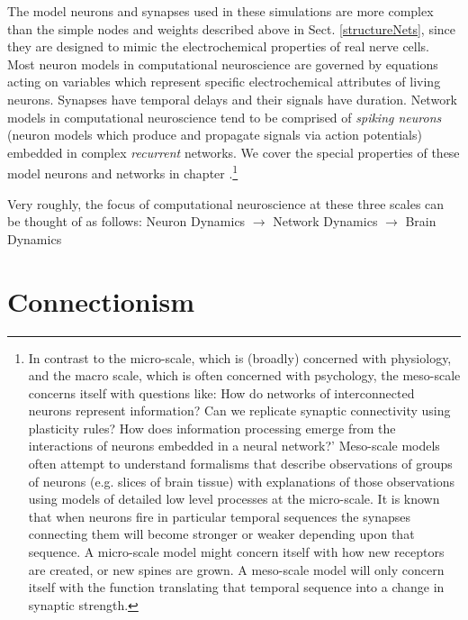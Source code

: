 The model neurons and synapses used in these simulations  are  more complex than the simple nodes and weights described above in Sect. \ref{structureNets},  since they are designed to mimic the electrochemical properties of real nerve cells. Most neuron models in computational neuroscience are governed by equations acting on variables which represent specific electrochemical attributes of living neurons. Synapses have temporal delays and their signals have duration. Network models in computational neuroscience tend to be comprised of \emph{spiking neurons} (neuron models which produce and propagate signals via action potentials) embedded in complex \emph{recurrent} networks. We cover the special properties of these model neurons and networks in chapter .\footnote{In contrast to the micro-scale, which is (broadly) concerned with physiology, and the macro scale, which is often concerned with psychology, the meso-scale concerns itself with questions like: How do networks of interconnected neurons represent information? Can we replicate synaptic connectivity using plasticity rules? How does information processing emerge from the interactions of neurons embedded in a neural network?'  Meso-scale models often attempt to understand formalisms that describe observations of groups of neurons (e.g. slices of brain tissue) with explanations of those observations using models of detailed low level processes at the micro-scale. It is known that when neurons fire in particular temporal sequences the synapses connecting them will become stronger or weaker depending upon that sequence. A micro-scale model might concern itself with how new receptors are created, or new spines are grown. A meso-scale model will only concern itself with the function translating that temporal sequence into a change in synaptic strength.} 

Very roughly, the focus of computational neuroscience at these  three scales can be thought of as follows:
Neuron Dynamics $\rightarrow$ Network Dynamics $\rightarrow$ Brain Dynamics

\section{Connectionism}\label{connectionism}



